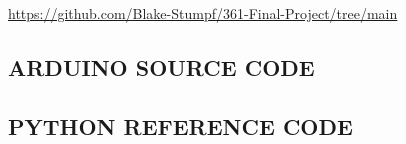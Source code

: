 \documentclass[12pt]{article}
\begin{document}
\url{https://github.com/Blake-Stumpf/361-Final-Project/tree/main}

\subsection{ARDUINO SOURCE CODE}
\label{code:arduino_breakout}


\subsection{PYTHON REFERENCE CODE}
\label{code:python_breakout}

\end{document}
